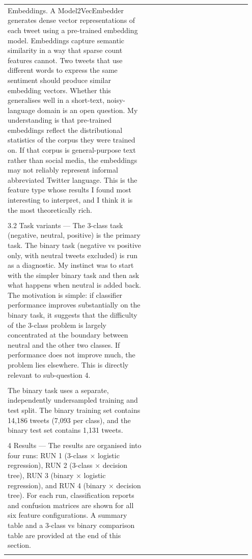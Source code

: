 \documentclass[11pt]{article}
\begin{document}
\begin{longtable}{|p{0.55\linewidth}|p{0.40\linewidth}|}
\hline
\rule{0pt}{3.5cm} & \\
\hline
Embeddings. A Model2VecEmbedder generates dense vector representations of each tweet using a pre-trained embedding model. Embeddings capture semantic similarity in a way that sparse count features cannot. Two tweets that use different words to express the same sentiment should produce similar embedding vectors. Whether this generalises well in a short-text, noisy-language domain is an open question. My understanding is that pre-trained embeddings reflect the distributional statistics of the corpus they were trained on. If that corpus is general-purpose text rather than social media, the embeddings may not reliably represent informal abbreviated Twitter language. This is the feature type whose results I found most interesting to interpret, and I think it is the most theoretically rich. & \\[2pt]
\hline
\rule{0pt}{3.5cm} & \\
\hline
3.2 Task variants --- The 3-class task (negative, neutral, positive) is the primary task. The binary task (negative vs positive only, with neutral tweets excluded) is run as a diagnostic. My instinct was to start with the simpler binary task and then ask what happens when neutral is added back. The motivation is simple: if classifier performance improves substantially on the binary task, it suggests that the difficulty of the 3-class problem is largely concentrated at the boundary between neutral and the other two classes. If performance does not improve much, the problem lies elsewhere. This is directly relevant to sub-question 4. & \\[2pt]
\hline
\rule{0pt}{3.5cm} & \\
\hline
The binary task uses a separate, independently undersampled training and test split. The binary training set contains 14,186 tweets (7,093 per class), and the binary test set contains 1,131 tweets. & \\[2pt]
\hline
\rule{0pt}{3.5cm} & \\
\hline
4 Results --- The results are organised into four runs: RUN 1 (3-class × logistic regression), RUN 2 (3-class × decision tree), RUN 3 (binary × logistic regression), and RUN 4 (binary × decision tree). For each run, classification reports and confusion matrices are shown for all six feature configurations. A summary table and a 3-class vs binary comparison table are provided at the end of this section. & \\[2pt]
\hline
\rule{0pt}{3.5cm} & \\

\end{longtable}
\end{document}
